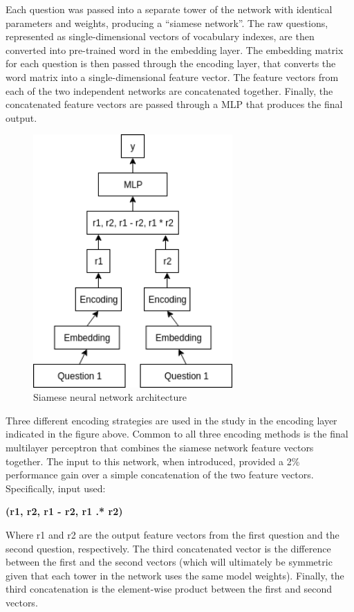 Each question was passed into a separate tower of the network with identical parameters and weights, producing a “siamese network”. The raw questions, represented as single-dimensional vectors of vocabulary indexes, are then converted into pre-trained word in the embedding layer. The embedding matrix for each question is then passed through the encoding layer, that converts the word matrix into a single-dimensional feature vector. The feature vectors from each of the two
independent networks are concatenated together. Finally, the concatenated feature vectors are passed through a \acl{MLP} that produces the final output.
\begin{figure}[H]
\begin{center}
	\includegraphics[width = 3in]{images/MLP.png}
	\caption{Siamese neural network architecture}
\end{center}
\end{figure}
Three different encoding strategies are used in the study in the encoding layer indicated in the figure above. Common to all three encoding methods is the final multilayer perceptron that combines the siamese network feature vectors together. The input to this network, when introduced, provided a 2\% performance gain over a simple concatenation of the
two feature vectors. Specifically, input used:
\begin{center}
\textbf{ (r1, r2, r1 - r2, r1 .* r2)}
\end{center} 
Where r1 and r2 are the output feature vectors from the first question and the second question, respectively. The third concatenated vector is the difference between the first and the second vectors (which will ultimately be symmetric given that each tower in the network uses the same model weights). Finally, the third concatenation is the element-wise
product between the first and second vectors.

